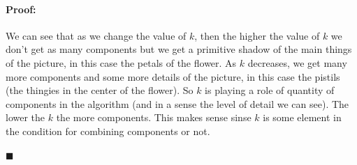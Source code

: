 \documentclass[12pt]{article}
\newenvironment{proof}{\paragraph{Proof: }}{\hfill$\blacksquare$}
\begin{document}
\begin{proof}
\begin{enumerate}
We can see that as we change the value of $k$, then the higher the value of $k$ we don't get as many components but we get a primitive shadow of the main things of the picture, in this case the petals of the flower. As $k$ decreases, we get many more components and some more details of the picture, in this case the pistils (the thingies in the center of the flower). So $k$ is playing a role of quantity of components in the algorithm (and in a sense the level of detail we can see). The lower the $k$ the more components. This makes sense sinse $k$ is some element in the condition for combining components or not.

\end{enumerate}
\end{proof}
\end{document}
